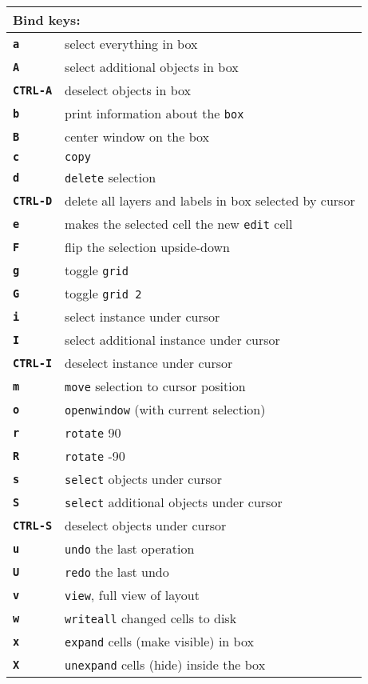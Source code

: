 \documentclass[10pt,a4paper]{article}
\newcommand{\key}[1]{\texttt{\textbf{#1}}}
\newcommand{\mac}[1]{\texttt{#1}}
\begin{document}
	\newpage

	\begin{tabular}{p{}p{}}
		\toprule
		\multicolumn{2}{l}{Bind keys:}\\
		\midrule
		\key{a} & select everything in box\\
		\key{A} & select additional objects in box\\
		\key{CTRL-A} & deselect objects in box\\
		\key{b} & print information about the \mac{box}\\
		\key{B} & center window on the box\\
		\key{c} & \mac{copy}\\
		\key{d} & \mac{delete} selection\\
		\key{CTRL-D} & delete all layers and labels in box selected by cursor\\
		\key{e} & makes the selected cell the new \mac{edit} cell\\
		\key{F} & flip the selection upside-down\\
		\key{g} & toggle \mac{grid}\\
		\key{G} & toggle \mac{grid 2}\\
		\key{i} & select instance under cursor\\
		\key{I} & select additional instance under cursor\\
		\key{CTRL-I} & deselect instance under cursor\\
		\key{m} & \mac{move} selection to cursor position\\
		\key{o} & \mac{openwindow} (with current selection)\\
		\key{r} & \mac{rotate} 90\\
		\key{R} & \mac{rotate} -90\\
		\key{s} & \mac{select} objects under cursor\\
		\key{S} & \mac{select} additional objects under cursor\\
		\key{CTRL-S} & deselect objects under cursor\\
		\key{u} & \mac{undo} the last operation\\
		\key{U} & \mac{redo} the last undo\\
		\key{v} & \mac{view}, full view of layout\\
		\key{w} & \mac{writeall} changed cells to disk\\
		\key{x} & \mac{expand} cells (make visible) in box\\
		\key{X} & \mac{unexpand} cells (hide) inside the box\\

\end{tabular}
\end{document}
